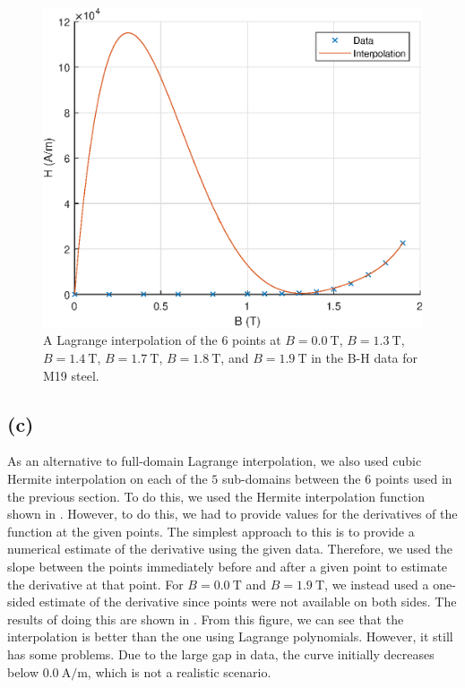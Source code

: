\documentclass[journal,hidelinks]{IEEEtran}
\begin{document}
\begin{figure}[!htb]
  \centering
  \includegraphics[width=\columnwidth]{question-1/q1b.eps}
  \caption{A Lagrange interpolation of the $6$ points at $B = \SI{0.0}{\tesla}$, $B = \SI{1.3}{\tesla}$, $B = \SI{1.4}{\tesla}$, $B = \SI{1.7}{\tesla}$, $B = \SI{1.8}{\tesla}$, and $B = \SI{1.9}{\tesla}$ in the B-H data for M19 steel.}
  \label{fig:q1b}
\end{figure}

\subsection*{(c)}

As an alternative to full-domain Lagrange interpolation, we also used cubic Hermite interpolation on each of the $5$ sub-domains between the $6$ points used in the previous section. To do this, we used the Hermite interpolation function shown in . However, to do this, we had to provide values for the derivatives of the function at the given points. The simplest approach to this is to provide a numerical estimate of the derivative using the given data. Therefore, we used the slope between the points immediately before and after a given point to estimate the derivative at that point. For $B = \SI{0.0}{\tesla}$ and $B = \SI{1.9}{\tesla}$, we instead used a one-sided estimate of the derivative since points were not available on both sides. The results of doing this are shown in . From this figure, we can see that the interpolation is better than the one using Lagrange polynomials. However, it still has some problems. Due to the large gap in data, the curve initially decreases below $\SI{0.0}{\ampere\per\meter}$, which is not a realistic scenario.
\end{document}
